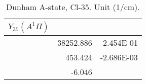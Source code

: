 \begin{table}[h]
\begin{tabular}{crr}
\toprule
$Y_{35} (A^1\Pi)$\\ \midrule 
& 38252.886 & 2.454E-01 \\
& 453.424 & -2.686E-03 \\
& -6.046 \\
\bottomrule
\end{tabular}\caption{Dunham A-state, Cl-35. Unit (1/cm).}\end{table}
